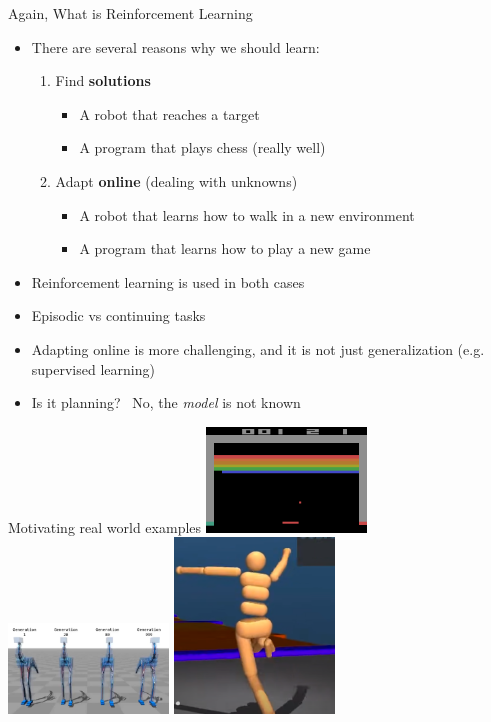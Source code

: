 \documentclass[presentation, 9pt]{beamer}\mode<presentation>{\usetheme{AMSBolognaFC}}
\begin{document}
\begin{frame}{Again, What is Reinforcement Learning}
\begin{itemize}
	\item There are several reasons why we should learn:
	\begin{enumerate}
		\item Find \textbf{solutions}
		\begin{itemize}
			\item A robot that reaches a target
			\item A program that plays chess (really well)
		\end{itemize}
		\item Adapt \textbf{online} (dealing with unknowns)
		\begin{itemize}
			\item A robot that learns how to walk in a new environment
			\item A program that learns how to play a new game
		\end{itemize}
	\end{enumerate}
	\item Reinforcement learning is used in both cases
	\item Episodic vs continuing tasks 

	\item Adapting online is more challenging, and it is not just generalization (e.g. supervised learning)
	\item Is it planning? \faArrowRight \, No, the \emph{model} is not known
\end{itemize}

\end{frame}

\begin{frame}{Motivating real world examples}
\centering
\href{https://www.youtube.com/watch?v=V1eYniJ0Rnk}{\includegraphics[width=0.32\textwidth]{img/atari.png}}
\href{https://www.youtube.com/watch?v=43cO39XBPIA}{\includegraphics[width=0.32\textwidth]{img/robots.png}}
\href{https://www.youtube.com/watch?v=gn4nRCC9TwQ}{\includegraphics[width=0.32\textwidth]{img/ppo.png}}
\end{frame}
\end{document}
